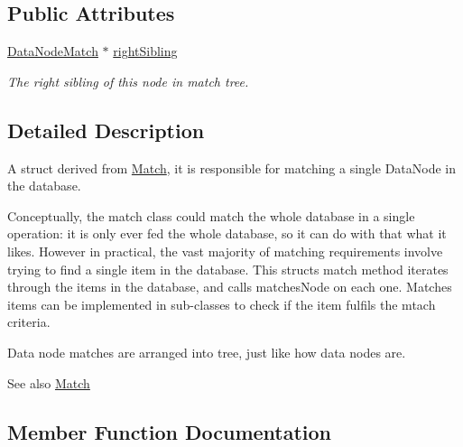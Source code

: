 \subsection*{Public Attributes}
\begin{DoxyCompactItemize}
\item 
\hyperlink{structRules_1_1DataNodeMatch}{Data\+Node\+Match} $\ast$ \hyperlink{structRules_1_1DataNodeMatch_a6a55cae5c9f132912f877f34b8fa716e}{right\+Sibling}\hypertarget{structRules_1_1DataNodeMatch_a6a55cae5c9f132912f877f34b8fa716e}{}\label{structRules_1_1DataNodeMatch_a6a55cae5c9f132912f877f34b8fa716e}

\begin{DoxyCompactList}\small\item\em The right sibling of this node in match tree. \end{DoxyCompactList}\end{DoxyCompactItemize}


\subsection{Detailed Description}
A struct derived from \hyperlink{structRules_1_1Match}{Match}, it is responsible for matching a single Data\+Node in the database. 

Conceptually, the match class could match the whole database in a single operation\+: it is only ever fed the whole database, so it can do with that what it likes. However in practical, the vast majority of matching requirements involve trying to find a single item in the database. This struct\textquotesingle{}s match method iterates through the items in the database, and calls matches\+Node on each one. Matches items can be implemented in sub-\/classes to check if the item fulfils the mtach criteria.

Data node matches are arranged into tree, just like how data nodes are.

\begin{DoxySeeAlso}{See also}
\hyperlink{structRules_1_1Match}{Match} 
\end{DoxySeeAlso}


\subsection{Member Function Documentation}
